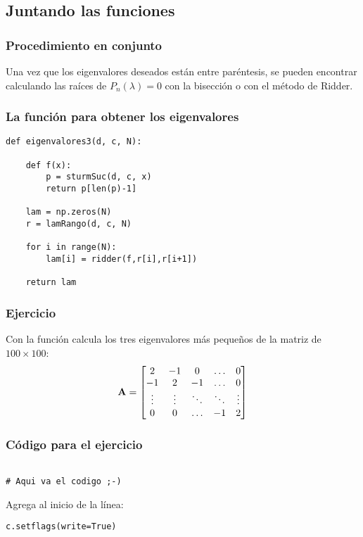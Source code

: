 \documentclass[12pt]{beamer}
\begin{document}
\subsection{Juntando las funciones}

\begin{frame}
\frametitle{Procedimiento en conjunto}
Una vez que los eigenvalores deseados están entre paréntesis, \pause se pueden encontrar calculando las raíces de $P_{n} (\lambda) = 0$ con la bisección o con el método de Ridder.
\end{frame}
\begin{frame}
\frametitle{La función para obtener los eigenvalores}
\begin{lstlisting}[caption=La función para calcular los eigenvalores de una matriz en banda 3]
def eigenvalores3(d, c, N):
    
    def f(x):
        p = sturmSuc(d, c, x)
        return p[len(p)-1]
    
    lam = np.zeros(N)
    r = lamRango(d, c, N)
    
    for i in range(N):
        lam[i] = ridder(f,r[i],r[i+1])
    
    return lam
\end{lstlisting}
\end{frame}
\begin{frame}
\frametitle{Ejercicio}
Con la función  calcula los tres eigenvalores más pequeños de la matriz de $100 \times 100$:
\pause
\begin{align*}
\vb{A} =
\begin{bmatrix}
2 & -1 & 0 & \ldots & 0 \\
-1 & 2 & -1 & \ldots & 0 \\
\vdots & \vdots & \ddots & \ddots & \vdots \\
0 & 0 & \ldots & -1 & 2
\end{bmatrix}
\end{align*}
\end{frame}
\begin{frame}[fragile]
\frametitle{Código para el ejercicio}
\begin{lstlisting}[caption=Código para el ejercicio]

# Aqui va el codigo ;-)

\end{lstlisting}
Agrega al inicio de  la línea:
\begin{verbatim}
c.setflags(write=True)
\end{verbatim}
\end{frame}
\end{document}
